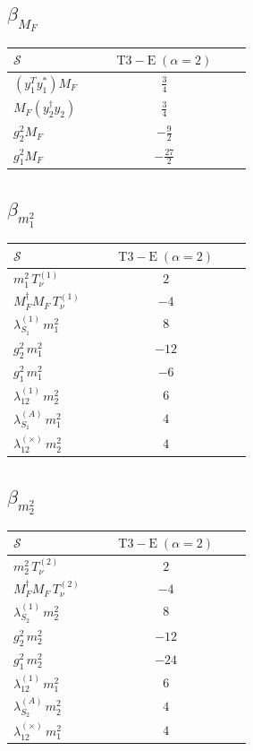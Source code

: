 \documentclass[9pt]{article}
\begin{document}
\subsection*{$ \beta_{M_F} $}
\begin{longtable}{@{}p{0.31\linewidth}c@{}}
\toprule
$\mathcal{S}$ & $ \mathrm{T3-E}\;(\alpha=2) $ \\
\midrule
$ (y_1^T y_1^*)M_F $ & $ \frac{3}{4} $ \\
$ M_F(y_2^\dagger y_2) $ & $ \frac{3}{4} $ \\
$ g_2^2M_F $ & $ - \frac{9}{2} $ \\
$ g_1^2M_F $ & $ - \frac{27}{2} $ \\
\bottomrule
\end{longtable}
\subsection*{$ \beta_{m_1^{2}} $}
\begin{longtable}{@{}p{0.31\linewidth}c@{}}
\toprule
$\mathcal{S}$ & $ \mathrm{T3-E}\;(\alpha=2) $ \\
\midrule
$ m_1^{2}\,T_{\nu}^{(1)} $ & $ 2 $ \\
$ M_F^\dagger M_F\,T_{\nu}^{(1)} $ & $ -4 $ \\
$ \lambda_{S_1}^{(1)}\,m_1^{2} $ & $ 8 $ \\
$ g_2^2\,m_1^{2} $ & $ -12 $ \\
$ g_1^2\,m_1^{2} $ & $ -6 $ \\
$ \lambda_{12}^{(1)}\,m_2^{2} $ & $ 6 $ \\
$ \lambda_{S_1}^{(A)}\,m_1^{2} $ & $ 4 $ \\
$ \lambda_{12}^{(\times)}\,m_2^{2} $ & $ 4 $ \\
\bottomrule
\end{longtable}
\subsection*{$ \beta_{m_2^{2}} $}
\begin{longtable}{@{}p{0.31\linewidth}c@{}}
\toprule
$\mathcal{S}$ & $ \mathrm{T3-E}\;(\alpha=2) $ \\
\midrule
$ m_2^{2}\,T_{\nu}^{(2)} $ & $ 2 $ \\
$ M_F^\dagger M_F\,T_{\nu}^{(2)} $ & $ -4 $ \\
$ \lambda_{S_2}^{(1)}\,m_2^{2} $ & $ 8 $ \\
$ g_2^2\,m_2^{2} $ & $ -12 $ \\
$ g_1^2\,m_2^{2} $ & $ -24 $ \\
$ \lambda_{12}^{(1)}\,m_1^{2} $ & $ 6 $ \\
$ \lambda_{S_2}^{(A)}\,m_2^{2} $ & $ 4 $ \\
$ \lambda_{12}^{(\times)}\,m_1^{2} $ & $ 4 $ \\
\bottomrule
\end{longtable}
\end{document}
